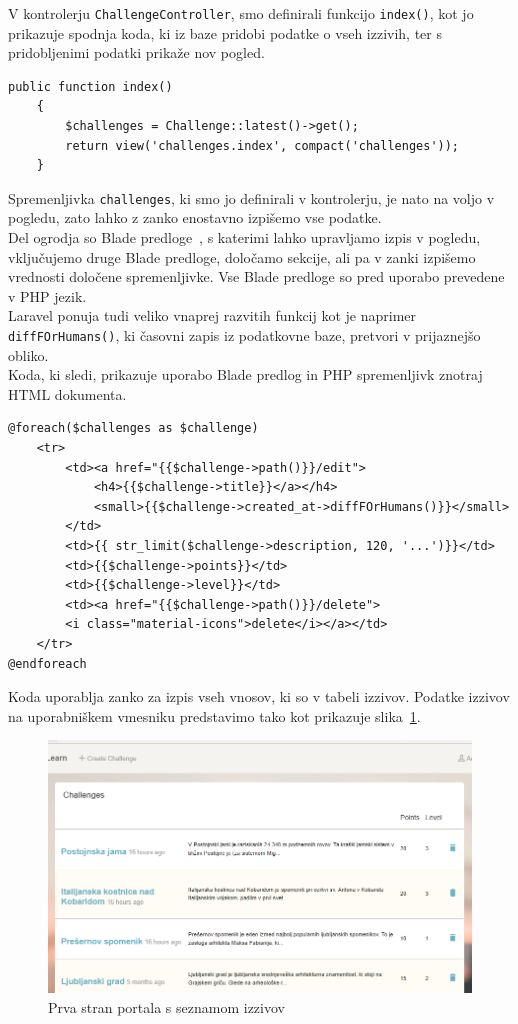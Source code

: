 \documentclass[a4paper, 12pt]{book}
\begin{document}
V kontrolerju \texttt{ChallengeController}, smo definirali funkcijo \texttt{index()}, kot jo prikazuje spodnja koda, ki iz baze pridobi podatke o vseh izzivih, ter s pridobljenimi podatki prikaže nov pogled.
\begin{lstlisting}[label=lst:index]
public function index()
    {
        $challenges = Challenge::latest()->get();
        return view('challenges.index', compact('challenges'));
    }
\end{lstlisting}
Spremenljivka \texttt{challenges}, ki smo jo definirali v kontrolerju, je nato na voljo v pogledu, zato lahko z zanko enostavno izpišemo vse podatke.\\Del ogrodja so Blade predloge~\cite{larablade}, s katerimi lahko upravljamo izpis v pogledu, vključujemo druge Blade predloge, določamo sekcije, ali pa v zanki izpišemo vrednosti določene spremenljivke. Vse Blade predloge so pred uporabo prevedene v PHP jezik.\\Laravel ponuja tudi veliko vnaprej razvitih funkcij kot je naprimer \texttt{diffFOrHumans()}, ki časovni zapis iz podatkovne baze, pretvori v prijaznejšo obliko.\\Koda, ki sledi, prikazuje uporabo Blade predlog in PHP spremenljivk znotraj HTML dokumenta.
\bigskip
\begin{lstlisting}
@foreach($challenges as $challenge)
    <tr>
        <td><a href="{{$challenge->path()}}/edit">
            <h4>{{$challenge->title}}</a></h4>
            <small>{{$challenge->created_at->diffFOrHumans()}}</small>   
        </td>
        <td>{{ str_limit($challenge->description, 120, '...')}}</td>
        <td>{{$challenge->points}}</td>
        <td>{{$challenge->level}}</td>
        <td><a href="{{$challenge->path()}}/delete">
        <i class="material-icons">delete</i></a></td>
    </tr>
@endforeach
\end{lstlisting}
Koda uporablja zanko za izpis vseh vnosov, ki so v tabeli izzivov. Podatke izzivov na uporabniškem vmesniku predstavimo tako kot prikazuje slika~\ref{portal_index}.
\begin{figure}[H]
\centering
\includegraphics[height=0.6\textwidth]{slike/portal_index}
\caption{Prva stran portala s seznamom izzivov}\label{portal_index}
\end{figure}
\label{ch6}
\end{document}
